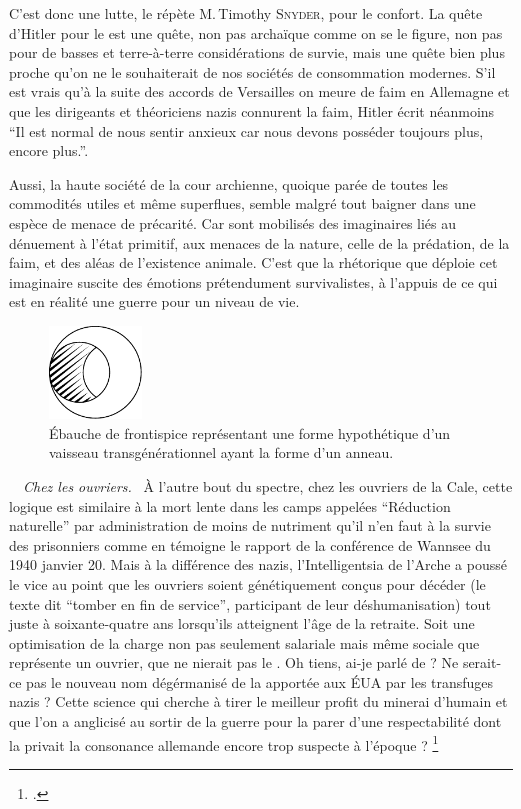 C’est donc une lutte, le répète M.\,Timothy \textsc{Snyder}, pour le confort.  La quête d’Hitler pour le  est une quête, non pas archaïque comme on se le figure, non pas pour de basses et terre-à-terre considérations de survie, mais une quête bien plus proche qu’on ne le souhaiterait de nos sociétés de consommation modernes. S’il est vrais qu’à la suite des accords de Versailles on meure  de faim en Allemagne et que les dirigeants et théoriciens nazis connurent la faim, Hitler écrit néanmoins \enquote{Il est normal de nous  sentir anxieux car nous devons posséder toujours plus, encore plus.}.

Aussi, la haute société de la cour archienne, quoique parée de toutes les commodités utiles et même superflues, semble malgré tout baigner dans une espèce de menace de précarité. Car sont mobilisés des imaginaires liés au dénuement à l’état primitif, aux menaces de la nature, celle de la prédation, de la faim, et des aléas de l’existence animale.
C’est que la rhétorique que déploie cet imaginaire suscite des émotions prétendument survivalistes, à l’appuis de ce qui est en réalité une guerre pour un niveau de vie.

\begin{figure}
	\vspace{-1em}
	\centering
	\includegraphics[width=0.22\textwidth]{frontispice-arche-evidee.pdf}
	\caption{Ébauche de frontispice représentant une forme hypothétique d’un vaisseau transgénérationnel ayant la forme d’un anneau.}
	\vspace{-10pt}
\end{figure}
\
\
{\em\normalsize Chez les ouvriers.}~
À l’autre bout du spectre, chez les ouvriers de la Cale, cette logique est similaire à la mort lente dans les camps appelées \enquote{Réduction naturelle} par administration de moins de nutriment qu’il n’en faut à la survie des prisonniers comme en témoigne le rapport de la conférence de Wannsee du 1940 janvier 20. Mais à la différence des nazis, l’Intelligentsia de l’Arche a poussé le vice au point que les ouvriers soient génétiquement conçus pour décéder (le texte dit \enquote{tomber en fin de service}, participant de leur déshumanisation) tout juste à soixante-quatre ans lorsqu’ils atteignent l’âge de la retraite. Soit une optimisation de la charge non pas seulement salariale mais même sociale que représente un ouvrier, que ne nierait pas le . Oh tiens, ai-je parlé de  ?
Ne serait-ce pas le nouveau nom dégérmanisé de la  apportée aux ÉUA par les transfuges nazis ? Cette science qui cherche à tirer le meilleur profit du minerai d’humain  et que l’on a anglicisé au sortir de la guerre pour la parer d’une respectabilité dont la privait la consonance allemande encore trop suspecte à l’époque ?
\footcite{JohannChapoutot-NRF2020-libresDObéir}


